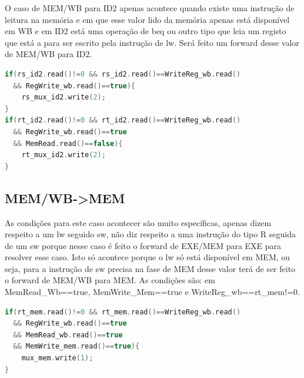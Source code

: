 \documentclass[pdftex,12pt,a4paper]{report}
\begin{document}
O caso de MEM/WB para ID2 apenas acontece quando existe uma instrução de leitura na memória e em que esse valor lido da memória apenas está disponível em WB e em ID2 está uma operação de beq ou outro tipo que leia um registo que está a para ser escrito pela instrução de lw. Será feito um forward desse valor de MEM/WB para ID2.

\begin{lstlisting}[language=c]
if(rs_id2.read()!=0 && rs_id2.read()==WriteReg_wb.read()
  && RegWrite_wb.read()==true){
    rs_mux_id2.write(2);
}
if(rt_id2.read()!=0 && rt_id2.read()==WriteReg_wb.read() 
  && RegWrite_wb.read()==true 
  && MemRead.read()==false){
    rt_mux_id2.write(2);
}
\end{lstlisting} 

\subsection{MEM/WB->MEM}
\begin{table}[!htb]
\centering
\label{my-label}
\end{table}

As condições para este caso acontecer são muito específicas, apenas dizem respeito a um lw seguido sw, não diz respeito a uma instrução do tipo R seguida de um sw porque nesse caso é feito o forward de EXE/MEM para EXE para resolver esse caso. Isto só acontece porque o lw só está disponível em MEM, ou seja, para a instrução de sw precisa na fase de MEM desse valor terá de ser feito o forward de MEM/WB para MEM. 
As condições são: em MemRead{\_}Wb==true, MemWrite{\_}Mem==true e WriteReg{\_}wb==rt{\_}mem!=0.

\begin{lstlisting}[language=c]
if(rt_mem.read()!=0 && rt_mem.read()==WriteReg_wb.read() 
  && RegWrite_wb.read()==true 
  && MemRead_wb.read()==true
  && MemWrite_mem.read()==true){
    mux_mem.write(1);
}
\end{lstlisting} 
\end{document}
